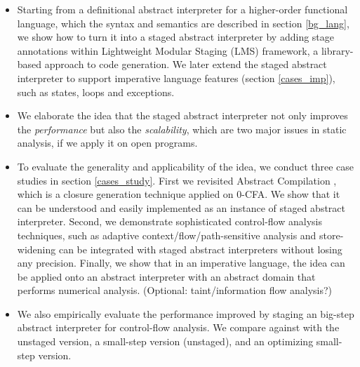 \begin{itemize}
\item Starting from a definitional abstract interpreter for a higher-order functional language,
  which the syntax and semantics are described in section \ref{bg_lang},
  we show how to turn it into a staged abstract interpreter by adding stage annotations within
  Lightweight Modular Staging (LMS) framework, a library-based approach to code generation. 
  We later extend the staged abstract interpreter to support imperative language features 
  (section \ref{cases_imp}), such as states, loops and exceptions.
\item We elaborate the idea that the staged abstract interpreter not only improves the \textit{performance}
  but also the \textit{scalability}, which are two major issues in static analysis, if we apply it on open
  programs. 
\item To evaluate the generality and applicability of the idea, we conduct three case studies in section \ref{cases_study}. 
  First we revisited Abstract Compilation \cite{Boucher:1996:ACN:647473.727587}, which is a closure generation 
  technique applied on 0-CFA. We show that it can be understood and easily implemented as an instance of 
  staged abstract interpreter. 
  Second, we demonstrate sophisticated control-flow analysis techniques, such as adaptive context/flow/path-sensitive 
  analysis and store-widening can be integrated with staged abstract interpreters without losing any precision.
  Finally, we show that in an imperative language, the idea can be applied onto an abstract interpreter with
  an abstract domain that performs numerical analysis.
  (Optional: taint/information flow analysis?)
\item We also empirically evaluate the performance improved by staging an big-step abstract interpreter 
  for control-flow analysis. We compare against with the unstaged version, a small-step version (unstaged), 
  and an optimizing small-step version.
\end{itemize}
